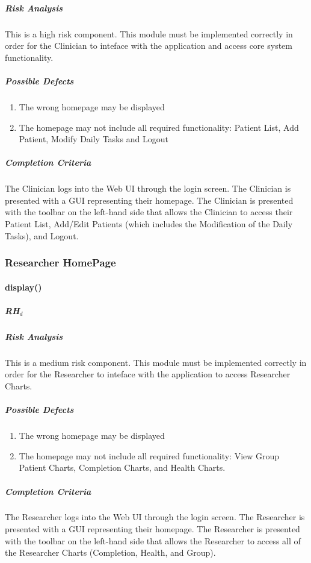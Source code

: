 \documentclass{article}
\begin{document}
\subparagraph{Risk Analysis}
This is a high risk component. This module must be implemented correctly in order for the Clinician to inteface with the application and access core system functionality.

\subparagraph{Possible Defects}
\begin{enumerate}
\item The wrong homepage may be displayed
\item The homepage may not include all required functionality: Patient List, Add Patient, Modify Daily Tasks and Logout
\end{enumerate}


\subparagraph{Completion Criteria}
The Clinician logs into the Web UI through the login screen. The Clinician is presented with a GUI representing their homepage. The Clinician is presented with the toolbar on the left-hand side
that allows the Clinician to access their Patient List, Add/Edit Patients (which includes the Modification of the Daily Tasks), and Logout.


\subsubsection{Researcher HomePage}

\paragraph{display()}

\subparagraph{RH$_{d}$}

\subparagraph{Risk Analysis}
This is a medium risk component. This module must be implemented correctly in order for the Researcher to inteface with the application to access Researcher Charts.

\subparagraph{Possible Defects}
\begin{enumerate}
\item The wrong homepage may be displayed
\item The homepage may not include all required functionality: View Group Patient Charts, Completion Charts, and Health Charts.
\end{enumerate}


\subparagraph{Completion Criteria}
The Researcher logs into the Web UI through the login screen. The Researcher is presented with a GUI representing their homepage. The Researcher is presented with the toolbar on the left-hand side
that allows the Researcher to access all of the Researcher Charts (Completion, Health, and Group).
\end{document}
